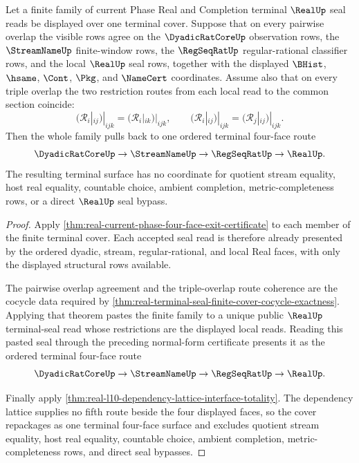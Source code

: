 \begin{theorem}
\label{thm:real-four-face-terminal-cover-pullback}
Let a finite family of current Phase Real and Completion terminal
$\RealUp$ seal reads be displayed over one terminal cover. Suppose that on
every pairwise overlap the visible rows agree on the $\DyadicRatCoreUp$
observation rows, the $\StreamNameUp$ finite-window rows, the
$\RegSeqRatUp$ regular-rational classifier rows, and the local $\RealUp$ seal
rows, together with the displayed $\BHist$, $\hsame$, $\Cont$, $\Pkg$, and
$\NameCert$ coordinates. Assume also that on every triple overlap the two
restriction routes from each local read to the common section coincide:
$$
(\mathcal R_i|_{ij})|_{ijk}=(\mathcal R_i|_{ik})|_{ijk},
\qquad
(\mathcal R_i|_{ij})|_{ijk}=(\mathcal R_j|_{ij})|_{ijk}.
$$
Then the whole family pulls back to one ordered terminal four-face route
$$
\DyadicRatCoreUp \to \StreamNameUp \to \RegSeqRatUp \to \RealUp.
$$
The resulting terminal surface has no coordinate for quotient stream equality,
host real equality, countable choice, ambient completion, metric-completeness
rows, or a direct $\RealUp$ seal bypass.
\end{theorem}
\begin{proof}
Apply \autoref{thm:real-current-phase-four-face-exit-certificate} to each
member of the finite terminal cover. Each accepted seal read is therefore
already presented by the ordered dyadic, stream, regular-rational, and local
Real faces, with only the displayed structural rows available.

The pairwise overlap agreement and the triple-overlap route coherence are the
cocycle data required by
\autoref{thm:real-terminal-seal-finite-cover-cocycle-exactness}. Applying that
theorem pastes the finite family to a unique public $\RealUp$ terminal-seal
read whose restrictions are the displayed local reads. Reading this pasted seal
through the preceding normal-form certificate presents it as the ordered
terminal four-face route
$$
\DyadicRatCoreUp \to \StreamNameUp \to \RegSeqRatUp \to \RealUp.
$$

Finally apply
\autoref{thm:real-l10-dependency-lattice-interface-totality}. The dependency
lattice supplies no fifth route beside the four displayed faces, so the cover
repackages as one terminal four-face surface and excludes quotient stream
equality, host real equality, countable choice, ambient completion,
metric-completeness rows, and direct seal bypasses.
\end{proof}

